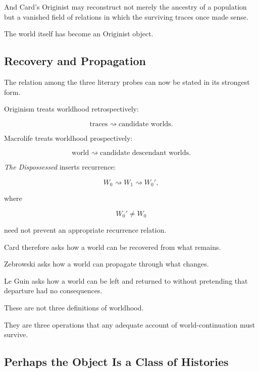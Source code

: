 \documentclass[
  11pt,
  a4paper,
  DIV=12,
  BCOR=0mm,
  parskip=half-
]{scrartcl}
\theoremstyle{definition}
\theoremstyle{plain}
\theoremstyle{remark}
\begin{document}
And Card's Originist may reconstruct not merely the ancestry of a population
but a vanished field of relations in which the surviving traces once made
sense.

The world itself has become an Originist object.


\subsection{Recovery and Propagation}
\label{sec:recovery-propagation}

The relation among the three literary probes can now be stated in its strongest
form.

Originism treats worldhood retrospectively:

\[
  \text{traces}
  \rightsquigarrow
  \text{candidate worlds}.
\]

Macrolife treats worldhood prospectively:

\[
  \text{world}
  \rightsquigarrow
  \text{candidate descendant worlds}.
\]

\emph{The Dispossessed} inserts recurrence:

\[
  W_0
  \rightsquigarrow
  W_1
  \rightsquigarrow
  W_0',
\]

where

\[
  W_0'\neq W_0
\]

need not prevent an appropriate recurrence relation.

Card therefore asks how a world can be recovered from what remains.

Zebrowski asks how a world can propagate through what changes.

Le Guin asks how a world can be left and returned to without pretending that
departure had no consequences.

These are not three definitions of worldhood.

They are three operations that any adequate account of world-continuation
must survive.


\subsection{Perhaps the Object Is a Class of Histories}
\label{sec:trajectory-classes}
\end{document}
